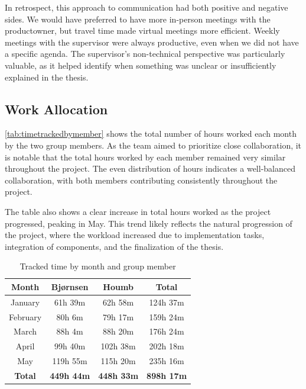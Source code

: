 In retrospect, this approach to communication had both positive and negative sides. We would have preferred to have more in-person meetings with the \gls{productowner}, but travel time made virtual meetings more efficient. Weekly meetings with the supervisor were always productive, even when we did not have a specific agenda. The supervisor's non-technical perspective was particularly valuable, as it helped identify when something was unclear or insufficiently explained in the thesis. 

\subsection{Work Allocation}

\autoref{tab:timetrackedbymember} shows the total number of hours worked each month by the two group members. As the team aimed to prioritize close collaboration, it is notable that the total hours worked by each member remained very similar throughout the project. The even distribution of hours indicates a well-balanced collaboration, with both members contributing consistently throughout the project.

The table also shows a clear increase in total hours worked as the project progressed, peaking in May. This trend likely reflects the natural progression of the project, where the workload increased due to implementation tasks, integration of components, and the finalization of the thesis.

\begin{table}[h]
    \centering
    \begin{tabular}{c|c|c|c}
        \hline
        \textbf{Month} & \textbf{Bjørnsen} & \textbf{Houmb} & \textbf{Total} \\
        \hline
        January  & 61h 39m  & 62h 58m   & 124h 37m  \\
        February & 80h 6m   & 79h 17m   & 159h 24m  \\
        March    & 88h 4m   & 88h 20m   & 176h 24m  \\
        April    & 99h 40m  & 102h 38m  & 202h 18m  \\
        May      & 119h 55m & 115h 20m  & 235h 16m  \\
        \hline
        \textbf{Total} & \textbf{449h 44m} & \textbf{448h 33m} & \textbf{898h 17m} \\
        \hline
    \end{tabular}
    \caption{Tracked time by month and group member}
    \label{tab:timetrackedbymember}
\end{table}

